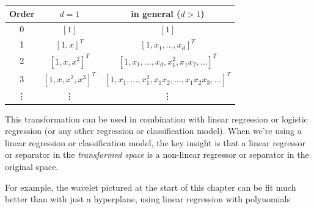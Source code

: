 \begin{center}
  \begin{tabular}{c c c}
    Order  & $d=1$             & in general ($d>1$)       \\
    \hline
    0      & $[1]$             & $[1]$                    \\
    1      & $[1,x]^T$         & $[1,x_1, \ldots, x_d]^T$ \\
    2      & $[1,x,x^2]^T$     & $[1,x_1, \ldots, x_d,
    x_1^2, x_1x_2, \ldots]^T$                             \\
    3      & $[1,x,x^2,x^3]^T$ & $[1,x_1, \ldots,
          x_1^2, x_1x_2, \ldots,
    x_1x_2x_3, \ldots]^T$                                 \\
    \vdots & \vdots            & \vdots
  \end{tabular}
\end{center}

This transformation can be used in combination with linear regression
or logistic regression (or any other regression or classification
model).  When we're using a linear regression or classification model,
the key insight is that a linear regressor or separator in the {\em
    transformed space} is a non-linear regressor or separator in the
original space.


% 
% 
% 

For example, the wavelet pictured at the start of this chapter can be
fit much better than with just a hyperplane, using linear regression
with polynomials

